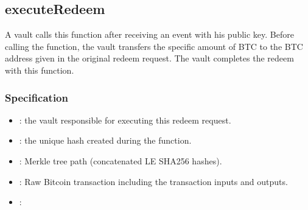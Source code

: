 \documentclass[a4paper,10pt,english]{sphinxmanual}
\begin{document}
\subsection{executeRedeem}
\label{\detokenize{spec/redeem:executeredeem}}\label{\detokenize{spec/redeem:id8}}
A vault calls this function after receiving an  event with his public key. Before calling the function, the vault transfers the specific amount of BTC to the BTC address given in the original redeem request. The vault completes the redeem with this function.


\subsubsection{Specification}
\label{\detokenize{spec/redeem:id9}}


\begin{itemize}
\item {} 
: the vault responsible for executing this redeem request.

\item {} 
: the unique hash created during the  function.

\item {} 
: Merkle tree path (concatenated LE SHA256 hashes).

\item {} 
: Raw Bitcoin transaction including the transaction inputs and outputs.

\end{itemize}

\begin{itemize}
\item {} 
:

\end{itemize}
\end{document}
